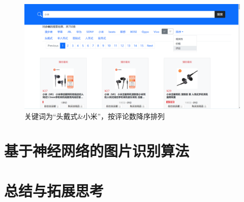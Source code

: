 \documentclass[a4paper,12pt]{article}
\begin{document}
    \begin{figure}[H]
        \centering
        \includegraphics[scale=0.4]{pic/pic14.png}
        \caption{关键词为“头戴式\&小米”，按评论数降序排列}
        \label{fig:14}
    \end{figure}
    





    \section{基于神经网络的图片识别算法}

    \section{总结与拓展思考}

    
\end{document}
